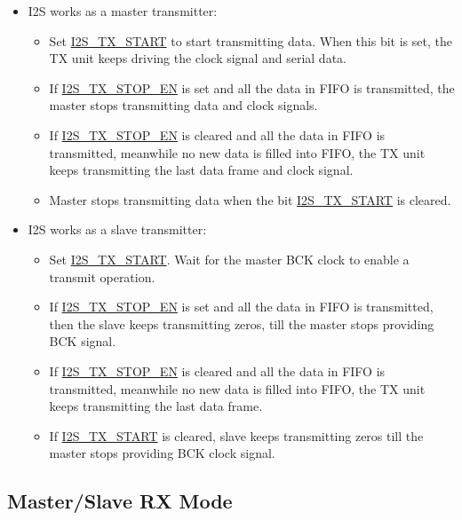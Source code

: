 \documentclass[main\_\_EN.tex]{subfiles}
\begin{document}
\begin{itemize}
    \item I2S works as a master transmitter:
    \begin{itemize}
        \item Set \hyperref[fielddesc:I2STXSTART]{I2S\_TX\_START} to start transmitting data. When this bit is set, the TX unit keeps driving the clock signal and serial data.
        \item If \hyperref[fielddesc:I2STXSTOPEN]{I2S\_TX\_STOP\_EN} is set and all the data in FIFO is transmitted, the master stops transmitting data and clock signals.
        \item If \hyperref[fielddesc:I2STXSTOPEN]{I2S\_TX\_STOP\_EN} is cleared and all the data in FIFO is transmitted, meanwhile no new data is filled into FIFO, the TX unit keeps transmitting the last data frame and clock signal.
        \item Master stops transmitting data when the bit  \hyperref[fielddesc:I2STXSTART]{I2S\_TX\_START} is cleared.
    \end{itemize}
    \item I2S works as a slave transmitter:
     \begin{itemize}
        \item Set \hyperref[fielddesc:I2STXSTART]{I2S\_TX\_START}. Wait for the master BCK clock to enable a transmit operation.
        \item If \hyperref[fielddesc:I2STXSTOPEN]{I2S\_TX\_STOP\_EN} is set and all the data in FIFO is transmitted, then the slave keeps transmitting zeros, till the master stops providing BCK signal.
        \item If \hyperref[fielddesc:I2STXSTOPEN]{I2S\_TX\_STOP\_EN} is cleared and all the data in FIFO is transmitted, meanwhile no new data is filled into FIFO, the TX unit keeps transmitting the last data frame. 
        \item If \hyperref[fielddesc:I2STXSTART]{I2S\_TX\_START} is cleared, slave keeps transmitting zeros till the master stops providing BCK clock signal.
    \end{itemize}
\end{itemize}

\subsection{Master/Slave RX Mode}
\end{document}

